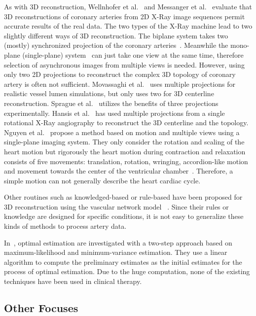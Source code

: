 As with 3D reconstruction, Wellnhofer et al.~\cite{Wellnhofer} and Messanger
et al.~\cite{Messenger} evaluate that 3D reconstructions of coronary
arteries from 2D X-Ray image sequences permit accurate results of the real
data. The two types of the X-Ray machine lead to two slightly different ways
of 3D reconstruction. The biplane system takes two (mostly) synchronized
projection of the coronary arteries~\cite{Wellnhofer}\cite{Messenger}.
Meanwhile the mono-plane (single-plane) system~\cite{Gollapudi} can just
take one view at the same time, therefore selection of asynchronous images
from multiple views is needed. However, using only two 2D projections to
reconstruct the complex 3D topology of coronary artery is often not
sufficient. Movassaghi et al.~\cite{Movassaghi} uses multiple projections
for realistic vessel lumen simulations, but only uses two for 3D centerline
reconstruction. Sprague et al.~\cite{Sprague} utilizes the benefits of three
projections experimentally. Hansis et al.~\cite{Hansis} has used multiple
projections from a single rotational X-Ray angiography to reconstruct the 3D
centerline and the topology. Nguyen et al.~\cite{Nguyen} propose a method
based on motion and multiple views using a single-plane imaging system. They
only consider the rotation and scaling of the heart motion but rigorously
the heart motion during contraction and relaxation consists of five
movements: translation, rotation, wringing, accordion-like motion and
movement towards the center of the ventricular chamber~\cite{Marcus}.
Therefore, a simple motion can not generally describe the heart cardiac
cycle.

Other routines such as knowledged-based or rule-based have been
proposed for 3D reconstruction using the vascular network
model~\cite{rule_based1} \cite{rule_based2}. Since their rules or
knowledge are designed for specific conditions, it is not easy to
generalize these kinds of methods to process artery data.

In~\cite{opti_est1}\cite{opti_est2}\cite{opti_est3}, optimal
estimation are investigated with a two-step approach based on
maximum-likelihood and minimum-variance estimation. They use a linear
algorithm to compute the preliminary estimates as the initial
estimates for the process of optimal estimation. Due to the huge
computation, none of the existing techniques have been used in
clinical therapy.

\subsection*{Other Focuses}

